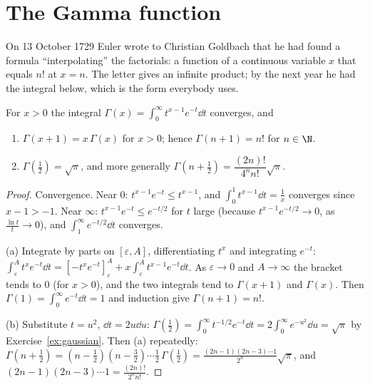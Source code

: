 \section{The Gamma function}

On 13 October 1729 Euler wrote to Christian Goldbach that he had found a formula ``interpolating'' the factorials: a function of a
continuous variable $x$ that equals $n!$ at $x=n$. The letter gives an infinite product; by the next year he had the integral below, which is the form everybody uses.

\begin{proposition}\label{prop:gammafn}
For $x>0$ the integral $\Gamma(x)=\displaystyle\int_0^\infty t^{x-1}e^{-t}\dd t$ converges, and
\begin{enumerate}[label=(\alph*)]
\item $\Gamma(x+1)=x\,\Gamma(x)$ for $x>0$; hence $\Gamma(n+1)=n!$ for $n\in\N$.
\item $\Gamma\left(\frac12\right)=\sqrt\pi$, and more generally $\Gamma\left(n+\frac12\right)=\dfrac{(2n)!}{4^nn!}\sqrt\pi$.

\end{enumerate}
\end{proposition}
\begin{proof}
Convergence. Near $0$: $t^{x-1}e^{-t}\le t^{x-1}$, and $\int_0^1t^{x-1}\dd t=\frac1x$ converges since $x-1>-1$. Near $\infty$: $t^{x-1}e^{-t}\le e^{-t/2}$ for $t$ large (because $t^{x-1}e^{-t/2}\to0$, as $\frac{\ln t}{t}\to0$), and $\int_1^\infty e^{-t/2}\dd t$ converges.

(a) Integrate by parts on $[\varepsilon,A]$, differentiating $t^x$ and integrating $e^{-t}$: $\int_\varepsilon^At^xe^{-t}\dd t=\left[-t^xe^{-t}\right]_\varepsilon^A+x\int_\varepsilon^At^{x-1}e^{-t}\dd t$. As $\varepsilon\to0$ and $A\to\infty$ the bracket tends to $0$ (for $x>0$), and the two integrals tend to $\Gamma(x+1)$ and $\Gamma(x)$. Then $\Gamma(1)=\int_0^\infty e^{-t}\dd t=1$ and induction give $\Gamma(n+1)=n!$.

(b) Substitute $t=u^2$, $\dd t=2u\dd u$: $\Gamma\left(\frac12\right)=\int_0^\infty t^{-1/2}e^{-t}\dd t=2\int_0^\infty e^{-u^2}\dd u=\sqrt\pi$ by Exercise~\ref{ex:gaussian}. Then (a) repeatedly: $\Gamma\left(n+\frac12\right)=\left(n-\frac12\right)\left(n-\frac32\right)\cdots\frac12\,\Gamma\left(\frac12\right)=\frac{(2n-1)(2n-3)\cdots1}{2^n}\sqrt\pi$, and $(2n-1)(2n-3)\cdots1=\frac{(2n)!}{2^nn!}$.

\end{proof}

